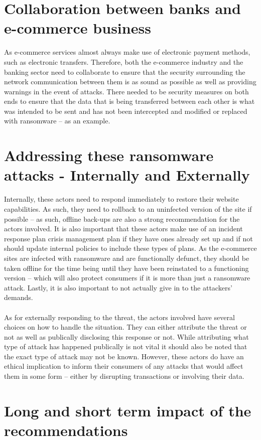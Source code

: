 \documentclass[conference]{IEEEtran}
\begin{document}
\section{Collaboration between banks and e-commerce business}
As e-commerce services almost always make use of electronic payment methods, such as electronic transfers. Therefore, both the e-commerce industry and the banking sector need to collaborate to ensure that the security surrounding the network communication between them is as sound as possible as well as providing warnings in the event of attacks. There needed to be security measures on both ends to ensure that the data that is being transferred between each other is what was intended to be sent and has not been intercepted and modified or replaced with ransomware – as an example.
\section{Addressing these ransomware attacks - Internally and Externally}
Internally, these actors need to respond immediately to restore their website capabilities. As such, they need to rollback to an uninfected version of the site if possible – as such, offline back-ups are also a strong recommendation for the actors involved. It is also important that these actors make use of an incident response plan crisis management plan if they have ones already set up and if not should update internal policies to include these types of plans. As the e-commerce sites are infected with ransomware and are functionally defunct, they should be taken offline for the time being until they have been reinstated to a functioning version – which will also protect consumers if it is more than just a ransomware attack. Lastly, it is also important to not actually give in to the attackers' demands.\\\\
As for externally responding to the threat, the actors involved have several choices on how to handle the situation. They can either attribute the threat or not as well as publically disclosing this response or not. While attributing what type of attack has happened publically is not vital it should also be noted that the exact type of attack may not be known. However, these actors do have an ethical implication to inform their consumers of any attacks that would affect them in some form – either by disrupting transactions or involving their data.
\section{Long and short term impact of the recommendations}
\end{document}
